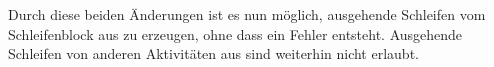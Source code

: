     Durch diese beiden Änderungen ist es nun möglich, ausgehende Schleifen vom Schleifenblock aus zu erzeugen, ohne dass ein Fehler entsteht.
    Ausgehende Schleifen von anderen Aktivitäten aus sind weiterhin nicht erlaubt.
